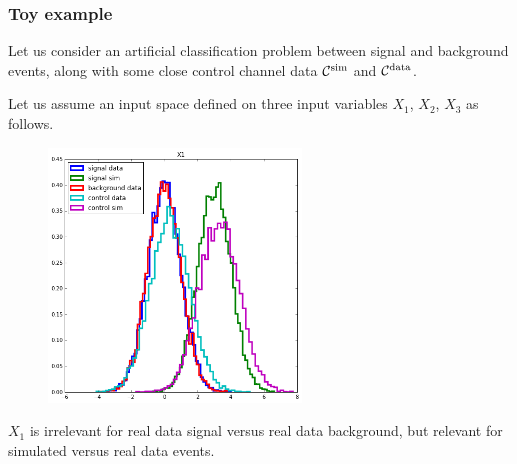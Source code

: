\documentclass{beamer}
\begin{document}

\begin{frame}
\frametitle{Toy example}

Let us consider an artificial classification problem between signal and
background events, along with some close control channel data ${\cal
C}^\text{sim}$ and ${\cal C}^\text{data}$.

\vspace{0.5cm}

Let us assume an input space defined on three input variables $X_1$, $X_2$,
$X_3$ as follows.

\end{frame}


\begin{frame}

\begin{figure}
\centering
\includegraphics[width=0.6\textwidth]{figures/x1.png}
\end{figure}

$X_1$ is {\color{red} irrelevant} for real data signal versus real data
background, but relevant for simulated versus real data events.

\end{frame}

\end{document}
